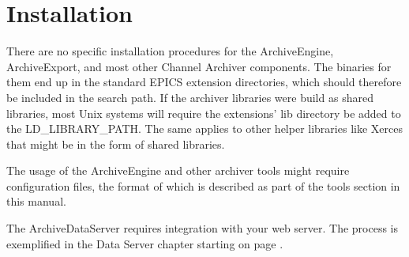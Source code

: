 \section{Installation}
There are no specific installation procedures for the ArchiveEngine,
ArchiveExport, and most other Channel Archiver components. The
binaries for them end up in the standard EPICS extension directories,
which should therefore be included in the search path. If the archiver
libraries were build as shared libraries, most Unix systems will
require the extensions' lib directory be added to the
LD\_LIBRARY\_PATH. The same applies to other helper libraries like
Xerces that might be in the form of shared libraries.

The usage of the ArchiveEngine and other archiver tools might require
configuration files, the format of which is described as part of the
tools section in this manual.

The ArchiveDataServer requires integration with your web server. The
process is exemplified in the Data Server chapter starting on page
\pageref{sec:dataserver}.

